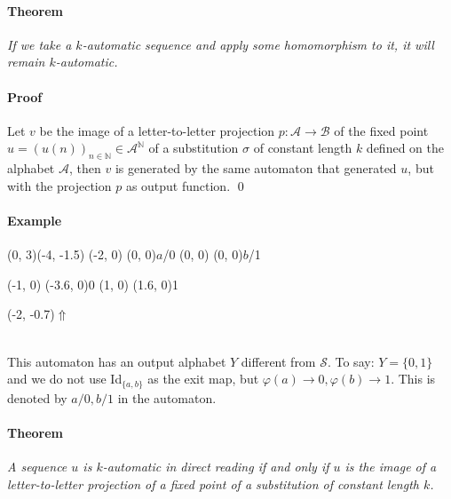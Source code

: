 \documentclass{article}
\begin{document}
\paragraph{Theorem} \emph{If we take a $k$-automatic sequence and apply some
homomorphism to it, it will remain $k$-automatic.}

\paragraph{Proof} Let $v$ be the image of a letter-to-letter
projection $p: \mathcal{A} \rightarrow \mathcal{B}$ of the fixed point
$u = (u(n))_{n \in \mathbb{N}} \in \mathcal{A}^\mathbb{N}$ of a substitution
$\sigma$ of constant length $k$ defined on the alphabet $\mathcal{A}$, then
$v$ is generated by the same automaton that generated $u$, but with the
projection $p$ as output function. \qed

\paragraph{Example\\}
\begin{graph}(0, 3)(-4, -1.5)
  (-2, 0) (0, 0){$a$/0}
  (0, 0)  (0, 0){$b$/1}

  (-1, 0) \freetext(-3.6, 0){0}
   
   
  (1, 0) \freetext(1.6, 0){1}

  \freetext(-2, -0.7){$\Uparrow$}
\end{graph}\\
This automaton has an output alphabet $Y$ different from $\mathcal{S}$. To
say: $Y = \{0, 1\}$ and we do not use Id$_{\{a, b\}}$ as the exit map, but
$\varphi(a) \rightarrow 0, \varphi(b) \rightarrow 1$. This is denoted by
$a/0, b/1$ in the automaton.

\paragraph{Theorem} \emph{A sequence $u$ is $k$-automatic in direct reading if 
and only if $u$ is the image of a letter-to-letter projection of a fixed point 
of a substitution of constant length $k$.}
\end{document}
